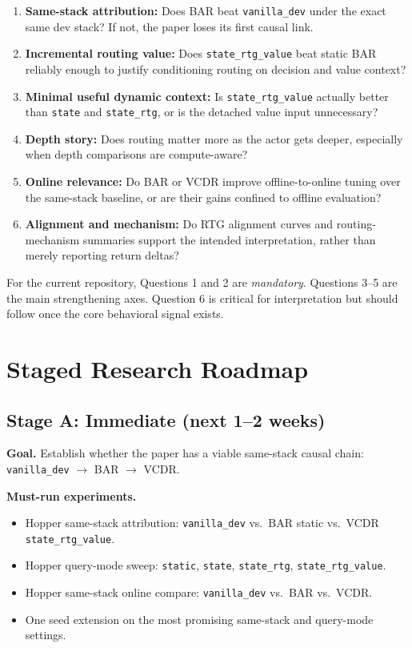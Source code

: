 \documentclass[11pt]{article}
\newcommand{\vanilla}{\texttt{vanilla\_dev}}
\begin{document}
\begin{enumerate}
  \item \textbf{Same-stack attribution:} Does BAR beat \vanilla{} under the exact same dev stack? If not, the paper loses its first causal link.
  \item \textbf{Incremental routing value:} Does \texttt{state\_rtg\_value} beat static BAR reliably enough to justify conditioning routing on decision and value context?
  \item \textbf{Minimal useful dynamic context:} Is \texttt{state\_rtg\_value} actually better than \texttt{state} and \texttt{state\_rtg}, or is the detached value input unnecessary?
  \item \textbf{Depth story:} Does routing matter more as the actor gets deeper, especially when depth comparisons are compute-aware?
  \item \textbf{Online relevance:} Do BAR or VCDR improve offline-to-online tuning over the same-stack baseline, or are their gains confined to offline evaluation?
  \item \textbf{Alignment and mechanism:} Do RTG alignment curves and routing-mechanism summaries support the intended interpretation, rather than merely reporting return deltas?
\end{enumerate}

For the current repository, Questions 1 and 2 are \emph{mandatory}. Questions 3--5 are the main strengthening axes. Question 6 is critical for interpretation but should follow once the core behavioral signal exists.

\section{Staged Research Roadmap}

\subsection*{Stage A: Immediate (next 1--2 weeks)}

\textbf{Goal.} Establish whether the paper has a viable same-stack causal chain: \vanilla{} \(\rightarrow\) BAR \(\rightarrow\) VCDR.

\textbf{Must-run experiments.}
\begin{itemize}
  \item Hopper same-stack attribution: \vanilla{} vs.\ BAR static vs.\ VCDR \texttt{state\_rtg\_value}.
  \item Hopper query-mode sweep: \texttt{static}, \texttt{state}, \texttt{state\_rtg}, \texttt{state\_rtg\_value}.
  \item Hopper same-stack online compare: \vanilla{} vs.\ BAR vs.\ VCDR.
  \item One seed extension on the most promising same-stack and query-mode settings.
\end{itemize}
\end{document}
